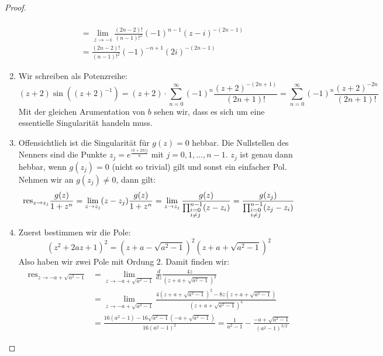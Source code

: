 \documentclass[11pt]{article}
\newcommand{\res}{\text{res}}
\begin{document}
\begin{proof}
\begin{enumerate}[label = (\alph*)]
$$\begin{aligned}
                  \\&= \lim_{z\to -i}\frac{(2n-2)!}{(n-1)!^2} (-1)^{n-1}(z-i)^{-(2n-1)}\\
                  &= \frac{(2n-2)!}{(n-1)!^2} (-1)^{-n+1}(2i)^{-(2n-1)}
            \end{aligned}$$
            \item Wir schreiben als Potenzreihe:
            $$(z+2) \sin ((z+2)^{-1}) = (z+2)\cdot \sum_{n=0}^\infty (-1)^n\frac{(z+2)^{-(2n+1)}}{(2n+1)!}
            =\sum_{n=0}^\infty (-1)^n\frac{(z+2)^{-2n}}{(2n+1)!}$$
            Mit der gleichen Arumentation von $b$ sehen wir, dass es sich um eine essentielle
            Singularität handeln muss.
            \item Offensichtlich ist die Singularität für $g(z) = 0$ hebbar. Die Nullstellen des Nenners
            sind die Punkte $z_j = e^{\frac{i\pi + 2\pi ij}{n}}$ mit $j=0,1,\dots , n-1$. $z_j$ ist
            genau dann hebbar, wenn $g(z_j)=0$ (nicht so trivial) gilt und sonst ein einfacher Pol. Nehmen wir an
            $g(z_j)\neq 0$, dann gilt:
            $$\res_{z\to z_j}\frac{g(z)}{1+z^n} = \lim_{z\to z_j} (z-z_j)\frac{g(z)}{1+z^n} =
            \lim_{z\to z_j}\frac{g(z)}{\prod_{
            \begin{subarray}{c}
                i = 0\\
                i\neq j
            \end{subarray}}^{n-1}(z-z_i)} = \frac{g(z_j)}{\prod_{
            \begin{subarray}{c}
                i = 0\\
                i\neq j
            \end{subarray}}^{n-1}(z_j-z_i)}$$
            \item Zuerst bestimmen wir die Pole:
            $$(z^2+2 a z+1)^2 = (z+a-\sqrt{a^2-1})^2(z+a+\sqrt{a^2-1})^2$$
            Also haben wir zwei Pole mit Ordung $2$. Damit finden wir:
            $$\begin{aligned}
                  \res_{z\to -a+\sqrt{a^2-1}} &= \lim_{z\to -a+\sqrt{a^2-1}}\frac{d}{dz}\frac{4z}{(z+a+\sqrt{a^2-1})^2}
                  \\& = \lim_{z\to -a+\sqrt{a^2-1}}\frac{4(z+a+\sqrt{a^2-1})^2-8z(z+a+\sqrt{a^2-1})}{(z+a+\sqrt{a^2-1})^4}\\
                  &= \frac{16(a^2-1)-16\sqrt{a^2-1}(-a+\sqrt{a^2-1})}{16(a^2-1)^2}
                  = \frac{1}{a^2-1}-\frac{-a+\sqrt{a^2-1}}{(a^2-1)^{3/2}}
            \end{aligned}$$

\end{enumerate}
\end{proof}
\end{document}
